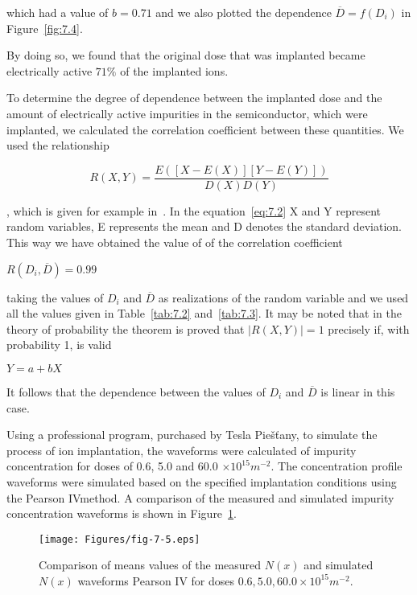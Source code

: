 which had a value of $b = 0.71$ and we also plotted the dependence
$\overline D = f(D_{i})$ in Figure~\ref{fig:7.4}.

By doing so, we found that the original dose that was implanted became
electrically active $71\%$ of the implanted ions.

To determine the degree of dependence between the implanted dose and
the amount of electrically active impurities in the semiconductor,
which were implanted, we calculated the correlation coefficient
between these quantities. We used the relationship

\begin{equation}\label{eq:7.2}
  R(X,Y) = \frac{E([X-E(X)][Y-E(Y)])}{D(X)D(Y)}
\end{equation}

, which is given for example in~\cite{7.1}. In the
equation~\ref{eq:7.2} X and Y represent random variables, E represents
the mean and D denotes the standard deviation. This way we have
obtained the value of of the correlation coefficient

\centerline{$R(D_{i}, \overline{D}) = 0.99$}

taking the values of $D_{i}$ and $\overline{D}$ as realizations of the
random variable and we used all the values given in
Table~\ref{tab:7.2} and~\ref{tab:7.3}. It may be noted that in the
theory of probability the theorem is proved that $\rvert R(X,Y)\rvert
= 1$ precisely if, with probability 1, is valid

\centerline{$Y = a + b X$}

It follows that the dependence between the values of $D_{i}$ and
$\overline D$ is linear in this case.

\newpage
Using a professional program, purchased by Tesla Piešťany, to
simulate the process of ion implantation, the waveforms were
calculated of impurity concentration for doses of 0.6, 5.0 and 60.0
$\times10^{15}m^{-2}$.  The concentration profile waveforms were
simulated based on the specified implantation conditions using the
Pearson IV\@ method.  A comparison of the measured and simulated
impurity concentration waveforms is shown in Figure~\ref{fig:7.5}.

\begin{figure}[h!]\centering
  \texttt{[image: Figures/fig-7-5.eps]}
  \caption[Comparison of the mean values of the measured waveforms
    $N(x)$ and simulated using the Pearson IV method]{Comparison of
    means values of the measured $N(x)$ and simulated $N(x)$ waveforms
    Pearson IV for doses $0.6, 5.0, 60.0 \times 10^{15}
    m^{-2}$.}\label{fig:7.5}
\end{figure}

